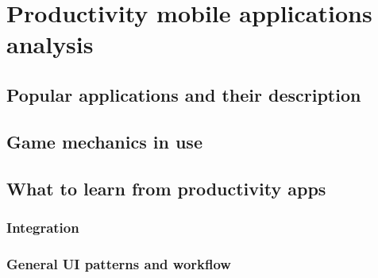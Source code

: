 \chapter{Productivity mobile applications analysis}

\section{Popular applications and their description}

\section{Game mechanics in use}

\section{What to learn from productivity apps}

\subsection{Integration}

\subsection{General UI patterns and workflow}